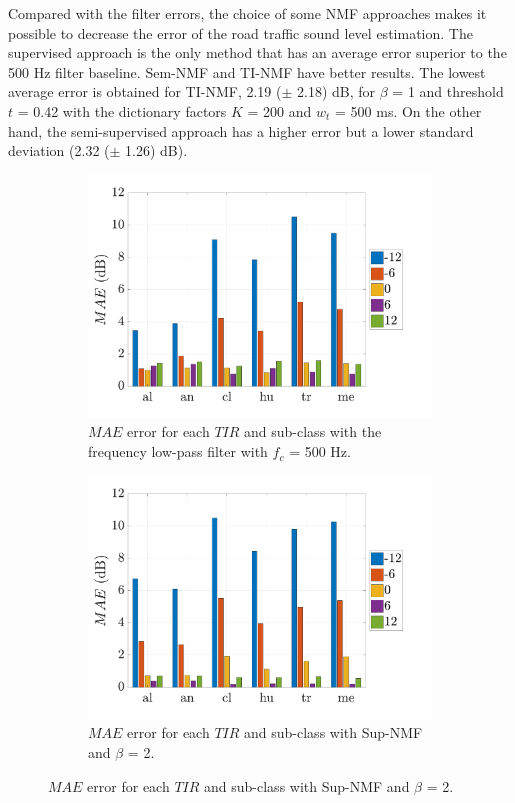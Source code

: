 \documentclass[twocolumn,a4paper,10pt]{article}
\begin{document}
Compared with the filter errors, the choice of some NMF approaches makes it possible to decrease the error of the road traffic sound level estimation. The supervised approach is the only method that has an average error superior to the 500 Hz filter baseline. Sem-NMF and TI-NMF have better results. The lowest average error is obtained for TI-NMF, 2.19 ($\pm$ 2.18) dB, for $\beta$ = 1 and threshold $t$ = 0.42 with the dictionary factors $K$ = 200 and $w_t$ = 500 ms. On the other hand, the semi-supervised approach has a higher error but a lower standard deviation (2.32 ($\pm$ 1.26) dB).

\begin{figure}[t]
    \centering
    \begin{subfigure}[t]{0.45\textwidth}
        \centering
        \includegraphics[width=\linewidth]{figures/filter_bar.pdf}
        \caption{$MAE$ error for each $TIR$ and sub-class with the frequency low-pass filter with $f_c$ = 500 Hz.}
        \label{fig:TIR_class_filter}
    \end{subfigure}%
    \hfill
    \begin{subfigure}[t]{0.45\textwidth}
        \centering
        \includegraphics[width=\linewidth]{figures/sup_bar.pdf}
        \caption{$MAE$ error for each $TIR$ and sub-class with Sup-NMF and $\beta$ = 2.}
                \label{fig:TIR_class_sup}
    \end{subfigure}


\end{figure}
\end{document}
